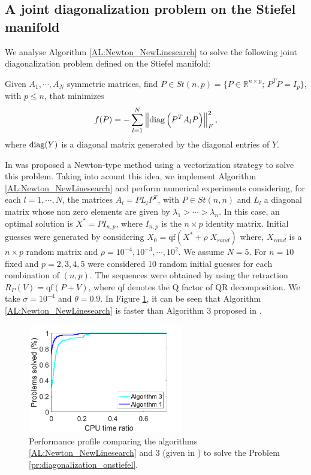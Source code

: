 \subsection{A joint diagonalization problem on the  Stiefel manifold}

We analyse Algorithm \ref{AL:Newton_NewLinesearch} to solve the following joint diagonalization problem defined on the Stiefel manifold:
\begin{problem}\label{pr:diagonalization_onstiefel}
Given $A_1, \cdots,A_N$ symmetric matrices, find $P \in St(n,p)=\{P \in \mathbb{R}^{n \times p}; \, P^TP=I_p\}$, with $p\leq n$, that minimizes
\begin{equation}\nonumber
f(P) = -\sum_{l=1}^N \left\| \operatorname{diag} \Big( P^TA_lP\Big)\right\|_F^2,
\end{equation}
where $\operatorname{diag}(Y)$ is a diagonal matrix generated by the diagonal entries of $Y$.
\end{problem}
\noindent In \cite {MR3734011} was proposed a Newton-type method using a vectorization strategy to solve this problem.
Taking into acount this idea, we implement Algorithm \ref{AL:Newton_NewLinesearch}  and perform numerical experiments considering, for each $l=1, \cdots,N$, the  matrices $A_l=PL_lP^T$, with $P \in St(n,n)$ and $L_l$ a diagonal matrix whose non zero elements are given by $\lambda_1>\cdots>\lambda_n$.
In this case, an optimal  solution is $X^*=PI_{n,p}$, where $I_{n,p}$ is the $n \times p$ identity matrix.
Initial guesses were generated by considering $X_0 = \mbox{qf}(X^*+\rho \; X_{rand})$ where, $X_{rand}$ is a $n \times p$ random matrix and $\rho = 10^{-4}, 10^{-3}, \cdots,10^{2}$.
We assume $N=5$.
For $n=10$ fixed and $p=2,3,4,5$ were considered 10 random initial guesses for each combination of $(n,p)$.
 The sequences were obtained by using the retraction $R_P(V)=\mbox{qf}(P+V)$, where qf denotes the Q factor of QR decomposition.
 We take   $\sigma = 10^{-4}$ and $\theta = 0.9$.
 In Figure \ref{fig:newarmijoxnlse4}, it can be seen that Algorithm \ref{AL:Newton_NewLinesearch} is faster than Algorithm 3 proposed in \cite{bortoloti2022efficient}.
 \begin{figure}[h]
	\centering
	\includegraphics[width=0.6\textwidth]{jointdiag.png}
	\caption{Performance profile comparing the algorithms \ref{AL:Newton_NewLinesearch} and  3 (given in \cite{bortoloti2022efficient}) to solve the Problem \ref{pr:diagonalization_onstiefel}.}
	\label{fig:newarmijoxnlse4}
\end{figure}


